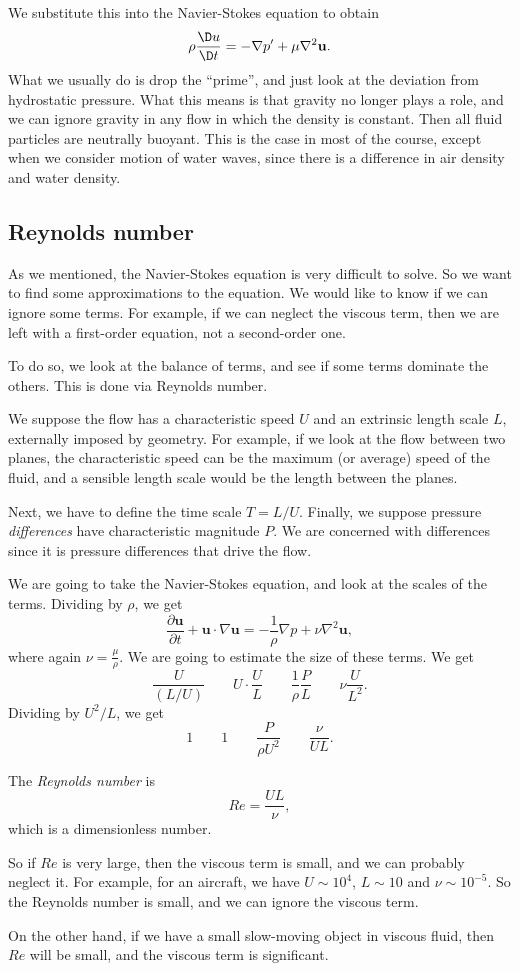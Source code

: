 \documentclass[a4paper]{article}
\begin{document}
We substitute this into the Navier-Stokes equation to obtain
\[
  \rho \frac{\D u}{\D t} = -\nabla p' + \mu \nabla^2 \mathbf{u}.
\]
What we usually do is drop the ``prime'', and just look at the deviation from hydrostatic pressure. What this means is that gravity no longer plays a role, and we can ignore gravity in any flow in which the density is constant. Then all fluid particles are neutrally buoyant. This is the case in most of the course, except when we consider motion of water waves, since there is a difference in air density and water density.

\subsection{Reynolds number} %
As we mentioned, the Navier-Stokes equation is very difficult to solve. So we want to find some approximations to the equation. We would like to know if we can ignore some terms. For example, if we can neglect the viscous term, then we are left with a first-order equation, not a second-order one.

To do so, we look at the balance of terms, and see if some terms dominate the others. This is done via Reynolds number.

We suppose the flow has a characteristic speed $U$ and an extrinsic length scale $L$, externally imposed by geometry. For example, if we look at the flow between two planes, the characteristic speed can be the maximum (or average) speed of the fluid, and a sensible length scale would be the length between the planes.

Next, we have to define the time scale $T = L/U$. Finally, we suppose pressure \emph{differences} have characteristic magnitude $P$. We are concerned with differences since it is pressure differences that drive the flow.

We are going to take the Navier-Stokes equation, and look at the scales of the terms. Dividing by $\rho$, we get
\[
  \frac{\partial \mathbf{u}}{\partial t} + \mathbf{u}\cdot \nabla \mathbf{u} = -\frac{1}{\rho} \nabla p + \nu \nabla^2 \mathbf{u},
\]
where again $\nu = \frac{\mu}{\rho}$. We are going to estimate the size of these terms. We get
\[
  \frac{U}{(L/U)} \quad\quad U \cdot \frac{U}{L} \quad\quad \frac{1}{\rho} \frac{P}{L} \quad\quad \nu \frac{U}{L^2}.
\]
Dividing by $U^2/L$, we get
\[
  1 \quad\quad 1 \quad\quad \frac{P}{\rho U^2} \quad\quad \frac{\nu}{UL}.
\]
\begin{defi}
  The \emph{Reynolds number} is
  \[
    Re = \frac{UL}{\nu},
  \]
  which is a dimensionless number.
\end{defi}
So if $Re$ is very large, then the viscous term is small, and we can probably neglect it. For example, for an aircraft, we have $U \sim 10^4$, $L \sim 10$ and $\nu \sim 10^{-5}$. So the Reynolds number is small, and we can ignore the viscous term.

On the other hand, if we have a small slow-moving object in viscous fluid, then $Re$ will be small, and the viscous term is significant.
\end{document}
